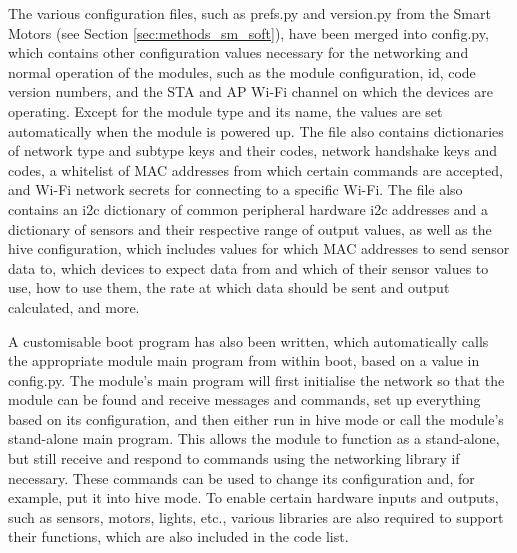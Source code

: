 The various configuration files, such as prefs.py and version.py from the Smart Motors (see Section \ref{sec:methods_sm_soft}), have been merged into config.py, which contains other configuration values necessary for the networking and normal operation of the modules, such as the module configuration, id, code version numbers, and the STA and AP Wi-Fi channel on which the devices are operating. Except for the module type and its name, the values are set automatically when the module is powered up.  The file also contains dictionaries of network type and subtype keys and their codes, network handshake keys and codes, a whitelist of MAC addresses from which certain commands are accepted, and Wi-Fi network secrets for connecting to a specific Wi-Fi. The file also contains an i2c dictionary of common peripheral hardware i2c addresses and a dictionary of sensors and their respective range of output values, as well as the hive configuration, which includes values for which MAC addresses to send sensor data to, which devices to expect data from and which of their sensor values to use, how to use them, the rate at which data should be sent and output calculated, and more.

A customisable boot program has also been written, which automatically calls the appropriate module main program from within boot, based on a value in config.py. The module's main program will first initialise the network so that the module can be found and receive messages and commands, set up everything based on its configuration, and then either run in hive mode or call the module's stand-alone main program. This allows the module to function as a stand-alone, but still receive and respond to commands using the networking library if necessary. These commands can be used to change its configuration and, for example, put it into hive mode. To enable certain hardware inputs and outputs, such as sensors, motors, lights, etc., various libraries are also required to support their functions, which are also included in the code list.

